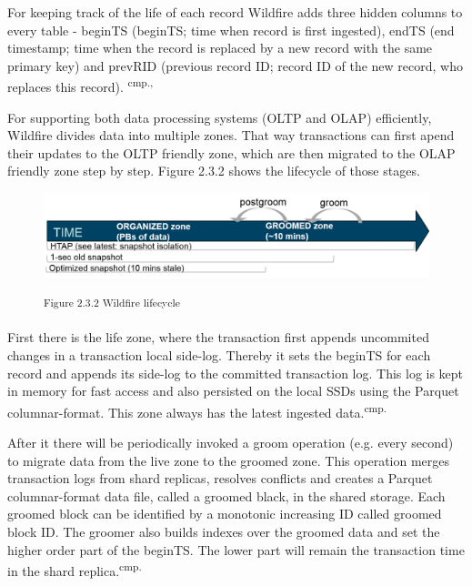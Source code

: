 For keeping track of the life of each record Wildfire adds three hidden columns to every table - \acs{beginTS} (\acl{beginTS}; time when record is first ingested), \acs{endTS} (end timestamp; time when the record is replaced by a new record with the same primary key) and \acs{prevRID} (previous record ID; record ID of the new record, who replaces this record). \textsuperscript{cmp.\cite{29}, \cite{30}}

For supporting both data processing systems (OLTP and OLAP) efficiently, Wildfire divides data into multiple zones. That way transactions can first apend their updates to the OLTP friendly zone, which are then migrated to the OLAP friendly zone step by step. Figure 2.3.2 shows the lifecycle of those stages.

\begin{figure}[h]
\centering
\includegraphics[width=\textwidth]{images/wildfire_lifecycle.png}

\textsuperscript{Figure 2.3.2 Wildfire lifecycle \cite{9}}
\end{figure}

First there is the life zone, where the transaction first appends uncommited changes in a transaction local side-log. Thereby it sets the beginTS for each record and appends its side-log to the committed transaction log. This log is kept in memory for fast access and also persisted on the local SSDs using the Parquet columnar-format. This zone always has the latest ingested data.\textsuperscript{cmp.\cite{30}}

After it there will be periodically invoked a groom operation (e.g. every second) to migrate data from the live zone to the groomed zone. This operation merges transaction logs from shard replicas, resolves conflicts and creates a Parquet columnar-format data file, called a groomed black, in the shared storage. Each groomed block can be identified by a monotonic increasing ID called groomed block ID. The groomer also builds indexes over the groomed data and set the higher order part of the beginTS. The lower part will remain the transaction time in the shard replica.\textsuperscript{cmp.\cite{30}}

